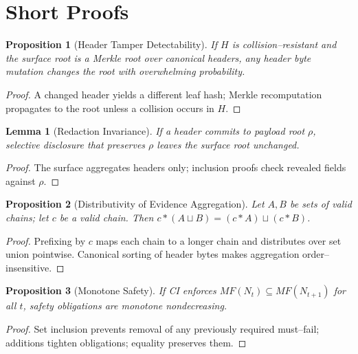 \documentclass[11pt]{article}
\theoremstyle{plain}
\newtheorem{proposition}{Proposition}
\newtheorem{lemma}{Lemma}
\theoremstyle{remark}
\begin{document}
\section{Short Proofs}
\label{sec:proofs}
\begin{proposition}[Header Tamper Detectability]
If $H$ is collision--resistant and the surface root is a Merkle root over canonical headers, any header byte mutation changes the root with overwhelming probability.
\end{proposition}
\begin{proof}
A changed header yields a different leaf hash; Merkle recomputation propagates to the root unless a collision occurs in $H$.
\end{proof}

\begin{lemma}[Redaction Invariance]
If a header commits to payload root $\rho$, selective disclosure that preserves $\rho$ leaves the surface root unchanged.
\end{lemma}
\begin{proof}
The surface aggregates headers only; inclusion proofs check revealed fields against $\rho$.
\end{proof}

\begin{proposition}[Distributivity of Evidence Aggregation]
Let $A,B$ be sets of valid chains; let $c$ be a valid chain. Then
$c\ast (A\sqcup B)=(c\ast A)\sqcup (c\ast B)$.
\end{proposition}
\begin{proof}
Prefixing by $c$ maps each chain to a longer chain and distributes over set union pointwise.
Canonical sorting of header bytes makes aggregation order--insensitive.
\end{proof}

\begin{proposition}[Monotone Safety]
If CI enforces $MF(N_t)\subseteq MF(N_{t+1})$ for all $t$, safety obligations are monotone nondecreasing.
\end{proposition}
\begin{proof}
Set inclusion prevents removal of any previously required must--fail; additions tighten obligations; equality preserves them.
\end{proof}
\end{document}
